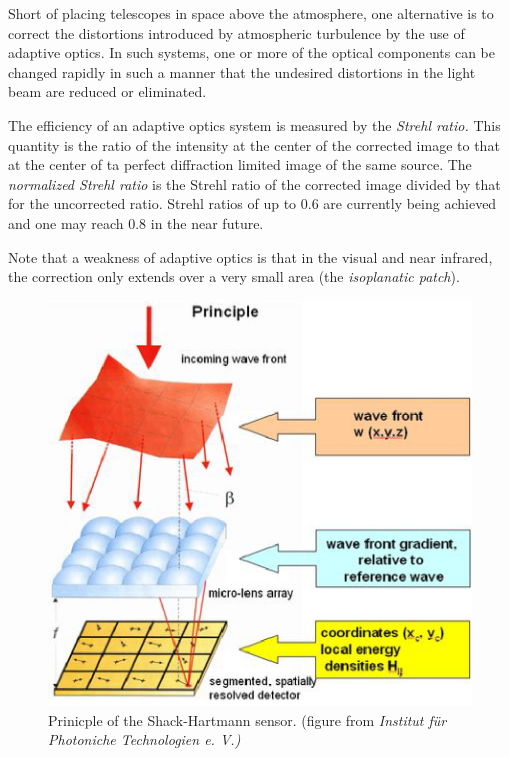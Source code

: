 Short of placing telescopes in space above the atmosphere, one alternative is
to correct the distortions introduced by atmospheric turbulence by the use
of adaptive optics. In such systems, one or more of the optical components
can be changed rapidly in such a manner that the undesired distortions
in the light beam are reduced or eliminated. 

The efficiency of an adaptive optics system is measured by the 
{\it Strehl ratio.} This quantity is the ratio of the intensity at the center
of the corrected image to that at the center of ta perfect diffraction 
limited image of the same source. The {\it normalized Strehl ratio} is the 
Strehl ratio of the corrected image divided by that for the uncorrected 
ratio. Strehl ratios of up to $0.6$ are currently being achieved and one may 
reach $0.8$ in the near future.

Note that a weakness of adaptive optics is that in the visual and near 
infrared, the correction only extends over a very small area (the 
{\it isoplanatic patch}). 

\begin{figure}[h]
  \centering
	\includegraphics{shack-hartmann.eps}
  \caption{Prinicple of the Shack-Hartmann sensor. (figure from {\it
Institut f\"ur Photoniche Technologien e. V.)}}
  \label{fig:shack-hartmann}
\end{figure}


